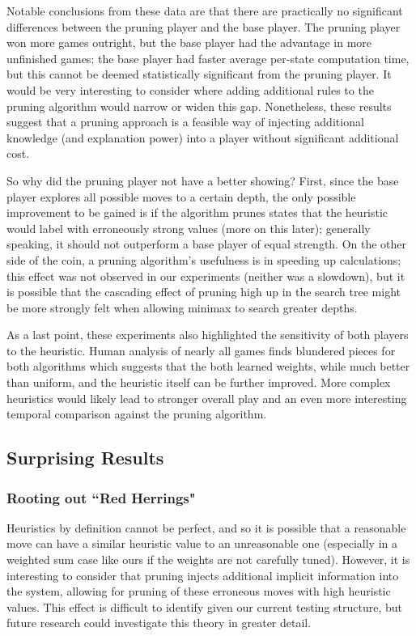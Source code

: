 \documentclass[letterpaper]{article}
\begin{document}
Notable conclusions from these data are that there are practically no significant differences between the pruning player and the base player.  The pruning player won more games outright, but the base player had the advantage in more unfinished games; the base player had faster average per-state computation time, but this cannot be deemed statistically significant from the pruning player.  It would be very interesting to consider where adding additional rules to the pruning algorithm would narrow or widen this gap.  Nonetheless, these results suggest that a pruning approach is a feasible way of injecting additional knowledge (and explanation power) into a player without significant additional cost.

So why did the pruning player not have a better showing?  First, since the base player explores all possible moves to a certain depth, the only possible improvement to be gained is if the algorithm prunes states that the heuristic would label with erroneously strong values (more on this later); generally speaking, it should not outperform a base player of equal strength.  On the other side of the coin, a pruning algorithm's usefulness is in speeding up calculations; this effect was not observed in our experiments (neither was a slowdown), but it is possible that the cascading effect of pruning high up in the search tree might be more strongly felt when allowing minimax to search greater depths.

As a last point, these experiments also highlighted the sensitivity of both players to the heuristic.  Human analysis of nearly all games finds blundered pieces for both algorithms which suggests that the both learned weights, while much better than uniform, and the heuristic itself can be further improved.  More complex heuristics would likely lead to stronger overall play and an even more interesting temporal comparison against the pruning algorithm.


\subsection{Surprising Results}
\subsubsection{Rooting out ``Red Herrings"}
Heuristics by definition cannot be perfect, and so it is possible that a reasonable move can have a similar heuristic value to an unreasonable one (especially in a weighted sum case like ours if the weights are not carefully tuned).  However, it is interesting to consider that pruning injects additional implicit information into the system, allowing for pruning of these erroneous moves with high heuristic values.  This effect is difficult to identify given our current testing structure, but future research could investigate this theory in greater detail.
\end{document}
